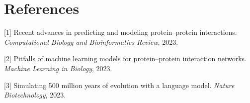 \documentclass{article}
\begin{document}
	\section*{References}
	
	{
	\small
		
		
	[1] Recent advances in predicting and modeling protein–protein interactions. {\it Computational Biology and Bioinformatics Review}, 2023.
	
	
	[2] Pitfalls of machine learning models for protein–protein interaction networks. {\it Machine Learning in Biology}, 2023.
	
	
	[3] Simulating 500 million years of evolution with a language model. {\it Nature Biotechnology}, 2023.
	}
	
	
	
\end{document}
